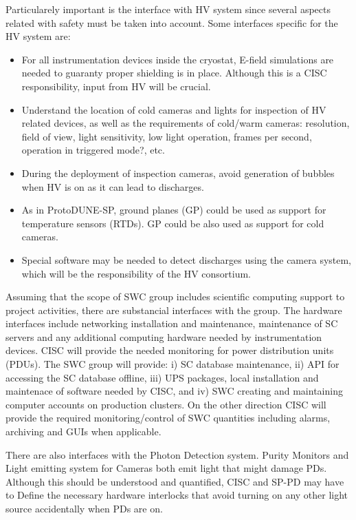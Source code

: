 Particularely important is the interface with HV system since several aspects related with safety must be taken into account. 
Some interfaces specific for the HV system are: 
\begin{itemize}
\item   For all instrumentation devices inside the cryostat,
  E-field simulations are needed to guaranty proper shielding is in place. Although this is a CISC responsibility, input from HV will be crucial.
\item Understand the location of cold cameras and lights for inspection of HV related devices, as well as the requirements
  of cold/warm cameras: resolution, field of view, light sensitivity, low light operation, frames per second, operation in triggered mode?,  etc. 
\item During the deployment of inspection cameras, avoid generation of bubbles when HV is on as it can lead to discharges.
\item As in ProtoDUNE-SP, ground planes (GP) could be used as support for temperature sensors (RTDs). GP could be also used as support for cold cameras. 
\item Special software may be needed to detect discharges
  using the camera system, which will be the responsibility of the HV consortium.
\end{itemize}

 Assuming that the scope of SWC group includes scientific computing support to project activities, there are substancial interfaces with the group. 
 The hardware interfaces include networking installation and maintenance, maintenance of SC servers and any additional computing hardware needed by instrumentation devices.
 CISC will provide the needed monitoring for power distribution units (PDUs). The SWC group will provide: i) SC database maintenance, ii) API for accessing the SC database offline,
 iii) UPS packages, local installation and maintenace of software needed by CISC, and iv) SWC creating and maintaining computer accounts on production clusters. 
 On the other direction CISC will provide the required monitoring/control of SWC quantities including alarms, archiving and GUIs when applicable. 


There are also interfaces with the Photon Detection system.
Purity Monitors and Light emitting system for Cameras both emit light that might damage PDs.
Although this should be understood and quantified, CISC and SP-PD may have to Define the necessary hardware interlocks
that avoid turning on any other light source accidentally when PDs are on.


